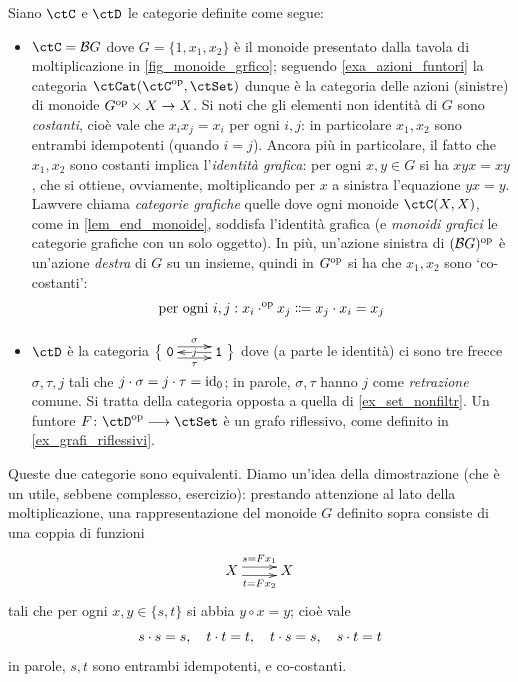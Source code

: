 \begin{example}\label{monoide_grafico}
 Siano \(\ctC\) e \(\ctD\) le categorie	definite come segue:
 \begin{itemize}
  \item \(\ctC=\susp{G}\) dove \(G=\{1,x_1,x_2\}\) è il monoide presentato dalla tavola di moltiplicazione in \ref{fig_monoide_grfico}; seguendo \ref{exa_azioni_funtori} la categoria \(\Hom{\ctCat}(\ctC^\op,\ctSet)\) dunque è la categoria delle azioni (sinistre) di monoide \(G^{\text{op}}\times X \to X\). Si noti che gli elementi non identità di \(G\) sono \emph{costanti}, cioè vale che \(x_ix_j=x_i\) per ogni \(i,j\): in particolare \(x_1,x_2\) sono entrambi idempotenti (quando \(i=j\)). Ancora più in particolare, il fatto che \(x_1,x_2\) sono costanti implica l'\emph{identità grafica}: per ogni \(x,y\in G\) si ha \(xyx=xy\),	che si ottiene, ovviamente, moltiplicando per \(x\) a sinistra l'equazione \(yx=y\). Lawvere chiama \emph{categorie grafiche} quelle dove ogni monoide \(\ctC(X,X)\), come in \ref{lem_end_monoide}, soddisfa l'identità grafica (e \emph{monoidi grafici} le categorie grafiche con un solo oggetto). In più, un'azione sinistra di \((\mathcal{B} G)^{\text{op}}\) è un'azione \emph{destra} di \(G\) su un insieme, quindi in \(G^{\text{op}}\) si ha che \(x_1,x_2\) sono `co-costanti':
        \[\text{per ogni } i,j : x_i\cdot^\op x_j \defeq  x_j \cdot x_i = x_j\]
  \item \(\ctD\) è la categoria
        \(\big\{\xymatrix{\texttt{0} \ar@<.4em>[r]^-\sigma\ar@<-.4em>[r]_-\tau & \texttt{1}\ar[l]|j}\big\}\)
        dove (a parte le identità) ci sono tre frecce \(\sigma,\tau,j\) tali che \(j\cdot \sigma = j\cdot \tau = \mathrm{id}_0\); in parole, \(\sigma,\tau\) hanno \(j\) come \emph{retrazione} comune. Si tratta della categoria opposta a quella di \ref{ex_set_nonfiltr}. Un funtore \(F \colon \ctD^\op \fun \ctSet\) è un grafo riflessivo, come definito in \ref{ex_grafi_riflessivi}.
 \end{itemize}
 \color{red} Queste due categorie sono equivalenti. Diamo un'idea della dimostrazione (che è un utile, sebbene complesso, esercizio): prestando attenzione al lato della moltiplicazione, una rappresentazione del monoide \(G\) definito sopra consiste di una coppia di funzioni
 \[\xymatrix{
  X \ar@<.3em>[r]^-{s=Fx_1}\ar@<-.3em>[r]_-{t=Fx_2} & X
  }\]
 tali che per ogni \(x,y\in\{s,t\}\) si abbia \(y\circ x=y\); cioè vale
 \[s\cdot s = s,\quad t\cdot t=t,\quad t\cdot s=s,\quad s\cdot t=t\]
 in parole, \(s,t\) sono entrambi idempotenti, e co-costanti.


\end{example}
